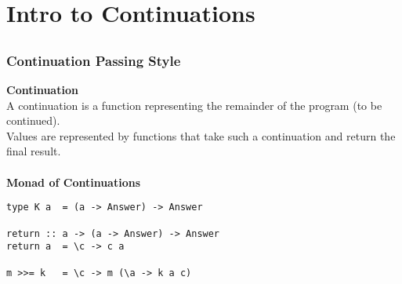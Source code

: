 \documentclass{beamer}
\newcommand{\bind}{\texttt{>>=}}
\begin{document}
\section{Intro to Continuations}
\subsection{} 
\begin{frame}[fragile]
\frametitle{Continuation Passing Style}

\textbf{Continuation}\\
A continuation is a function representing the remainder of the program (to be continued). \\
Values are represented by functions that take such a continuation and return the final result. \\\ \\ 

\textbf{Monad of Continuations}
\begin{lstlisting}
type K a  = (a -> Answer) -> Answer

return :: a -> (a -> Answer) -> Answer
return a  = \c -> c a

m >>= k   = \c -> m (\a -> k a c)
\end{lstlisting}

 
 
\end{frame}


\end{document}
